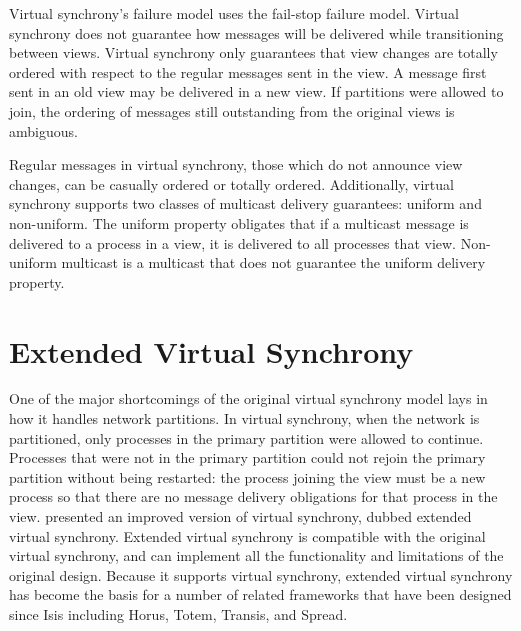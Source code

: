 Virtual synchrony's failure model uses the fail-stop failure model. Virtual synchrony does not guarantee how messages will be delivered while transitioning between views. Virtual synchrony only guarantees that view changes are totally ordered with respect to the regular messages sent in the view. A message first sent in an old view may be delivered in a new view. If partitions were allowed to join, the ordering of messages still outstanding from the original views is ambiguous.

Regular messages in virtual synchrony, those which do not announce view changes, can be casually ordered or totally ordered. Additionally, virtual synchrony supports two classes of multicast delivery guarantees: uniform and non-uniform. The uniform property obligates that if a multicast message is delivered to a process in a view, it is delivered to all processes that view. Non-uniform multicast is a multicast that does not guarantee the uniform delivery property.

\section{Extended Virtual Synchrony}
One of the major shortcomings of the original virtual synchrony model lays in how it handles network partitions. In virtual synchrony, when the network is partitioned, only processes in the primary partition were allowed to continue. Processes that were not in the primary partition could not rejoin the primary partition without being restarted: the process joining the view must be a new process so that there are no message delivery obligations for that process in the view. \cite{EXTENDEDVIRTUALSYNCHRONY} presented an improved version of virtual synchrony, dubbed extended virtual synchrony. Extended virtual synchrony is compatible with the original virtual synchrony, and can implement all the functionality and limitations of the original design. Because it supports virtual synchrony, extended virtual synchrony has become the basis for a number of related frameworks that have been designed since Isis including Horus, Totem, Transis, and Spread.

